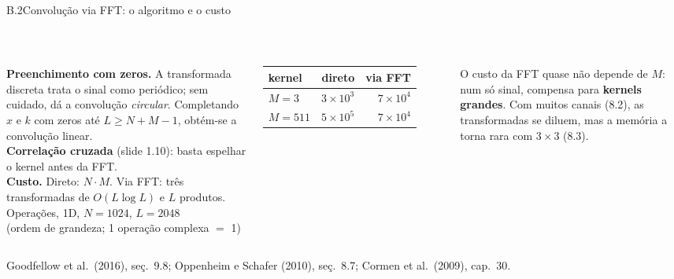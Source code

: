 \documentclass[aspectratio=169,11pt]{beamer}
\newcommand{\conv}{\ast}
\begin{document}
\begin{frame}{B.2\enspace Convolução via FFT: o algoritmo e o custo}
  \centering
  \\[0.1em]
  \raggedright
  \begin{columns}[T]
    \footnotesize
    \textbf{Preenchimento com zeros.} A transformada discreta trata o sinal como periódico; sem cuidado, dá a convolução
    \emph{circular}. Completando $x$ e $k$ com zeros até $L\ge N+M-1$, obtém-se a convolução linear.\\[0.4em]
    \textbf{Correlação cruzada} (slide 1.10): basta espelhar o kernel antes da FFT.\\[0.4em]
    \textbf{Custo.} Direto: $N\cdot M$. Via FFT: três transformadas de $O(L\log L)$ e $L$ produtos.
    \footnotesize
    \centering
    Operações, 1D, $N=1024$, $L=2048$\\ {\scriptsize(ordem de grandeza; 1 operação complexa $=$ 1)}\\[0.3em]
    \begin{tabular}{lrr}
      \toprule
      kernel & direto & via FFT \\ \midrule
      $M=3$   & $3\times10^{3}$ & $7\times10^{4}$ \\
      $M=511$ & $5\times10^{5}$ & $7\times10^{4}$ \\ \bottomrule
    \end{tabular}\\[0.4em]
    \raggedright
    O custo da FFT quase não depende de $M$: num só sinal, compensa para \textbf{kernels grandes}. Com muitos canais (8.2), as transformadas
    se diluem, mas a memória a torna rara com $3\times3$ (8.3).
  \end{columns}
  {\scriptsize\textcolor{cinza}{Goodfellow et al.\ (2016), seç.~9.8; Oppenheim e Schafer (2010), seç.~8.7; Cormen et al.\ (2009), cap.~30.}}
\end{frame}
\end{document}
